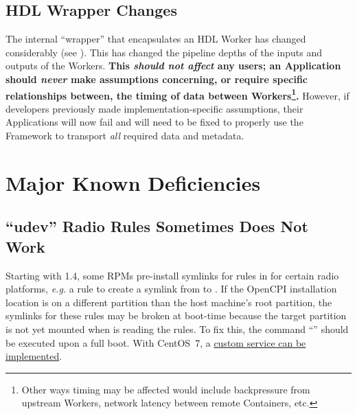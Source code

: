 \subsection{HDL Wrapper Changes} %
\label{sec:15_hdl_wrappers}
The internal ``wrapper'' that encapsulates an HDL Worker has changed considerably (see ).
This has changed the pipeline depths of the inputs and outputs of the Workers.
\textbf{This \textit{should not affect} any users; an Application should \textit{never} make assumptions concerning, or require specific relationships between, the timing of data between Workers\footnote{Other ways timing may be affected would include backpressure from upstream Workers, network latency between remote Containers,  etc.}.}
However, if developers previously made implementation-specific assumptions, their Applications will now fail and will need to be fixed to properly use the Framework to transport \textit{all} required data and metadata.

\section{Major Known Deficiencies}
\label{sec:15_bugs}
\subsection{``udev'' Radio Rules Sometimes Does Not Work} %
\label{bug:5275}
Starting with 1.4, some RPMs pre-install symlinks for rules in  for certain radio platforms, \textit{e.g.} a rule to create a symlink from  to . If the OpenCPI installation location is on a different partition than the host machine's root partition, the symlinks for these rules may be broken at boot-time because the target partition is not yet mounted when  is reading the rules. To fix this, the command ``'' should be executed upon a full boot. With CentOS~7, a \href{https://askubuntu.com/a/679600/139131}{custom  service can be implemented}.

\iffalse %
\subsection{``python3'' Symlink Missing} %
\label{bug:5477}
Some ``python3'' RPMs do not provide a default symlink from \path{/usr/bin/python3} to their proper executable\footnote{For example, CentOS~7's \path{python34-3.4.10-1.el7.x86_64} does not, while the slightly-older \path{3.4.9-2.el7.x86_64} did.}.
This is not considered a deficiency of the framework itself, but the Python packager.
If your system does not have \path{/usr/bin/python3}, a system administrator needs to create one for you pointing to your installation of Python3, \textit{e.g.} ``\code{cd /usr/bin; sudo ln -s python3.4 python3}'' for Python 3.4.
The \path{opencpi-devel} RPM works around this by installing a symlink, but non-RPM users \textit{may} need to manually create the symlink.
\fi

